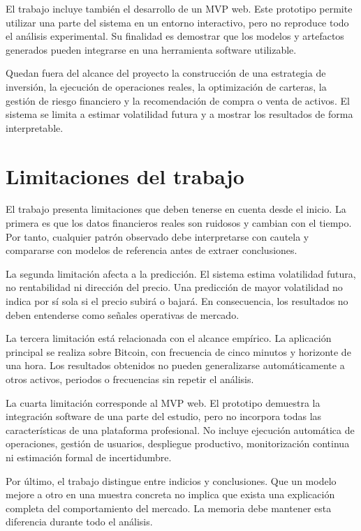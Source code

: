 El trabajo incluye también el desarrollo de un MVP web. Este prototipo permite utilizar una parte del sistema en un entorno interactivo, pero no reproduce todo el análisis experimental. Su finalidad es demostrar que los modelos y artefactos generados pueden integrarse en una herramienta software utilizable.

Quedan fuera del alcance del proyecto la construcción de una estrategia de inversión, la ejecución de operaciones reales, la optimización de carteras, la gestión de riesgo financiero y la recomendación de compra o venta de activos. El sistema se limita a estimar volatilidad futura y a mostrar los resultados de forma interpretable.

\section{Limitaciones del trabajo}\label{sec:limitaciones-objetivos}

El trabajo presenta limitaciones que deben tenerse en cuenta desde el inicio. La primera es que los datos financieros reales son ruidosos y cambian con el tiempo. Por tanto, cualquier patrón observado debe interpretarse con cautela y compararse con modelos de referencia antes de extraer conclusiones.

La segunda limitación afecta a la predicción. El sistema estima volatilidad futura, no rentabilidad ni dirección del precio. Una predicción de mayor volatilidad no indica por sí sola si el precio subirá o bajará. En consecuencia, los resultados no deben entenderse como señales operativas de mercado.

La tercera limitación está relacionada con el alcance empírico. La aplicación principal se realiza sobre Bitcoin, con frecuencia de cinco minutos y horizonte de una hora. Los resultados obtenidos no pueden generalizarse automáticamente a otros activos, periodos o frecuencias sin repetir el análisis.

La cuarta limitación corresponde al MVP web. El prototipo demuestra la integración software de una parte del estudio, pero no incorpora todas las características de una plataforma profesional. No incluye ejecución automática de operaciones, gestión de usuarios, despliegue productivo, monitorización continua ni estimación formal de incertidumbre.

Por último, el trabajo distingue entre indicios y conclusiones. Que un modelo mejore a otro en una muestra concreta no implica que exista una explicación completa del comportamiento del mercado. La memoria debe mantener esta diferencia durante todo el análisis.

